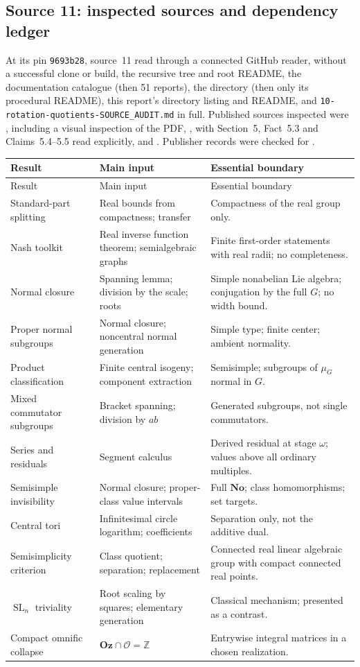 \documentclass[11pt,letterpaper]{article}
\numberwithin{equation}{section}
\theoremstyle{definition}
\theoremstyle{remark}
\newcommand{\No}{\mathbf{No}}
\newcommand{\Z}{\mathbb Z}
\newcommand{\OO}{\mathcal O}
\newcommand{\Oz}{\mathbf{Oz}}
\newcommand{\SL}{\operatorname{SL}}
\begin{document}
\subsection{Source 11: inspected sources and dependency ledger}\label{e3:cpt:sub:ledger11}

At its pin \texttt{9693b28}, source~11 read through a connected GitHub reader,
without a successful clone or build, the recursive tree and root README, the
documentation catalogue (then 51 reports), the  directory (then
only its procedural README), this report's directory listing and README, and
\texttt{10-rotation-quotients-SOURCE\_AUDIT.md} in full. Published sources
inspected were \cite{DM}, including a visual inspection of the PDF, \cite{BP},
with Section~5, Fact~5.3 and Claims~5.4--5.5 read explicitly, \cite{Kramer} and
\cite{BG}. Publisher records were checked for \cite{Gonshor,Conway,BCR}.

\begin{longtable}{L{0.26\textwidth}L{0.3\textwidth}L{0.35\textwidth}}
\toprule
Result & Main input & Essential boundary\\
\midrule
\endfirsthead
\toprule Result & Main input & Essential boundary\\\midrule
\endhead
Standard-part splitting & Real bounds from compactness; transfer & Compactness of the real group only.\\
Nash toolkit & Real inverse function theorem; semialgebraic graphs & Finite first-order statements with real radii; no completeness.\\
Normal closure & Spanning lemma; division by the scale; roots & Simple nonabelian Lie algebra; conjugation by the full $G$; no width bound.\\
Proper normal subgroups & Normal closure; noncentral normal generation & Simple type; finite center; ambient normality.\\
Product classification & Finite central isogeny; component extraction & Semisimple; subgroups of $\mu_G$ normal in $G$.\\
Mixed commutator subgroups & Bracket spanning; division by $ab$ & Generated subgroups, not single commutators.\\
Series and residuals & Segment calculus & Derived residual at stage $\omega$; values above all ordinary multiples.\\
Semisimple invisibility & Normal closure; proper-class value intervals & Full $\No$; class homomorphisms; set targets.\\
Central tori & Infinitesimal circle logarithm; coefficients & Separation only, not the additive dual.\\
Semisimplicity criterion & Class quotient; separation; replacement & Connected real linear algebraic group with compact connected real points.\\
$\SL_n$ triviality & Root scaling by squares; elementary generation & Classical mechanism; presented as a contrast.\\
Compact omnific collapse & $\Oz\cap\OO=\Z$ & Entrywise integral matrices in a chosen realization.\\
\bottomrule
\end{longtable}
\end{document}
